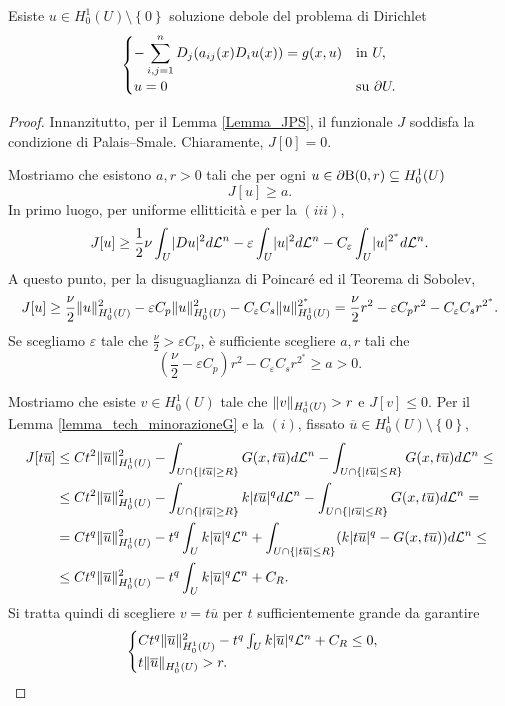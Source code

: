 \begin{teorema}
Esiste $u \in H^{1}_0(U)\setminus \left\lbrace 0\right\rbrace $ soluzione debole del problema di Dirichlet
\[ 	\begin{cases}
	-\displaystyle\sum_{i,j=1}^n D_j(a_{ij}(x)D_iu(x)) = g(x,u) & \textup{in } U,\\
	u = 0 & \textup{su } \partial U.
\end{cases} \]
\end{teorema}
\begin{proof}
Innanzitutto, per il Lemma \eqref{Lemma_JPS}, il funzionale $J$ soddisfa la condizione di Palais--Smale. Chiaramente, $J[0] = 0$.
	
Mostriamo che esistono $a,r >0$ tali che per ogni $u \in \partial \textup{B}(0,r) \subseteq H^1_0(U)$
\[ J[u] \ge a. \] 
In primo luogo, per uniforme ellitticità e per la $(iii)$,
\[ J[u] \ge \frac{1}{2} \nu \int_U \lvert Du\rvert^2 d\mathcal{L}^n - \varepsilon \int_U \lvert u\rvert^2 d\mathcal{L}^n - C_\varepsilon \int_U \lvert u\rvert^{2^\ast}d\mathcal{L}^n. \]
A questo punto, per la disuguaglianza di Poincaré ed il Teorema di Sobolev,
\[ J[u] \ge \frac{\nu}{2} \lVert u\rVert_{H^1_0(U)}^2 -\varepsilon C_p\lVert u\rVert_{H^1_0(U)}^2 - C_\varepsilon C_s \lVert u\rVert_{H^1_0(U)}^{2^\ast} = \frac{\nu}{2} r^2 -\varepsilon C_pr^2 - C_\varepsilon C_s r^{2^\ast}.  \]
Se scegliamo $\varepsilon$ tale che $\frac{\nu}{2}> \varepsilon C_p$, è sufficiente scegliere $a,r$ tali che 
\[ \left( \frac{\nu}{2} -\varepsilon C_p\right) r^2 - C_\varepsilon C_s r^{2^\ast} \ge a>0. \]

Mostriamo che esiste $v \in H^1_0(U)$ tale che $\lVert v\rVert_{H^1_0(U)}>r$ e $J[v]\le 0$. Per il Lemma \eqref{lemma_tech_minorazioneG} e la $(i)$, fissato $\overline{u} \in H^1_0(U)\setminus \left\lbrace 0\right\rbrace$,
\begin{align*}
	J[t\overline{u}] &\le Ct^2 \lVert\overline{u}\rVert_{H^1_0(U)}^2 - \int_{U \cap \left\lbrace \lvert t\overline{u}\rvert \ge R\right\rbrace} G(x,t\overline{u})d\mathcal{L}^n -\int_{U \cap \left\lbrace \lvert t\overline{u}\rvert \le R\right\rbrace} G(x,t\overline{u})d\mathcal{L}^n \le \\
	&\le C t^2\lVert\overline{u}\rVert_{H^1_0(U)}^2 -\int_{U \cap \left\lbrace \lvert t\overline{u}\rvert \ge R\right\rbrace} k\lvert t\overline{u}\rvert^qd\mathcal{L}^n -\int_{U \cap \left\lbrace \lvert t\overline{u}\rvert \le R\right\rbrace} G(x,t\overline{u})d\mathcal{L}^n = \\
	&=  C t^q\lVert\overline{u}\rVert_{H^1_0(U)}^2 - t^q\int_U k\lvert\overline{u}\rvert^q\mathcal{L}^n +\int_{U \cap \left\lbrace \lvert t\overline{u}\rvert \le R\right\rbrace}(k\lvert t\overline{u}\rvert^q-G(x,t\overline{u}))d\mathcal{L}^n \le \\
	&\le Ct^q\lVert\overline{u}\rVert_{H^1_0(U)}^2 - t^q\int_U k\lvert\overline{u}\rvert^q\mathcal{L}^n + C_R.
\end{align*}
Si tratta quindi di scegliere $v = t\overline{u}$ per $t$ sufficientemente grande da garantire 
\[ \begin{cases}
	Ct^q\lVert\overline{u}\rVert_{H^1_0(U)}^2 - t^q\int_U k\lvert\overline{u}\rvert^q\mathcal{L}^n + C_R \le 0, \\
	t \lVert\overline{u}\rVert_{H^1_0(U)} > r.
\end{cases} \]


\end{proof}
